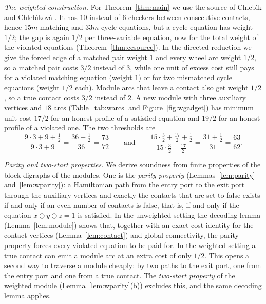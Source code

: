 \documentclass[11pt]{amsart}
\theoremstyle{definition}
\theoremstyle{remark}
\numberwithin{equation}{section}
\begin{document}
\emph{The weighted construction.} For Theorem~\ref{thm:main} we use the source of Chleb\'{\i}k and Chleb\'{\i}kov\'a \cite[Theorems~3 and~5]{CC22}. It has $10$ instead of $6$ checkers between consecutive contacts, hence $15m$ matching and $33m$ cycle equations, but a cycle equation has weight $1/2$; the gap is again $1/2$ per three-variable equation, now for the total weight of the violated equations (Theorem~\ref{thm:ccsource}). In the directed reduction we give the forced edge of a matched pair weight $1$ and every wheel arc weight $1/2$, so a matched pair costs $3/2$ instead of $3$, while one unit of excess cost still pays for a violated matching equation (weight $1$) or for two mismatched cycle equations (weight $1/2$ each). Module arcs that leave a contact also get weight $1/2$, so a true contact costs $3/2$ instead of $2$. A new module with three auxiliary vertices and $18$ arcs (Table~\ref{tab:warcs} and Figure~\ref{fig:wgadget}) has minimum unit cost $17/2$ for an honest profile of a satisfied equation and $19/2$ for an honest profile of a violated one. The two thresholds are
\[
\frac{9\cdot3+9+\tfrac12}{9\cdot3+9}=\frac{36+\tfrac12}{36}=\frac{73}{72}
\qquad\text{and}\qquad
\frac{15\cdot\tfrac32+\tfrac{17}{2}+\tfrac12}{15\cdot\tfrac32+\tfrac{17}{2}}=\frac{31+\tfrac12}{31}=\frac{63}{62}.
\]

\emph{Parity and two-start properties.} We derive soundness from finite properties of the block digraphs of the modules. One is the \emph{parity property} (Lemmas~\ref{lem:parity} and~\ref{lem:wparity}): a Hamiltonian path from the entry port to the exit port through the auxiliary vertices and exactly the contacts that are set to false exists if and only if an even number of contacts is false, that is, if and only if the equation $x\oplus y\oplus z=1$ is satisfied. In the unweighted setting the decoding lemma (Lemma~\ref{lem:module}) shows that, together with an exact cost identity for the contact vertices (Lemma~\ref{lem:contact}) and global connectivity, the parity property forces every violated equation to be paid for. In the weighted setting a true contact can emit a module arc at an extra cost of only $1/2$. This opens a second way to traverse a module cheaply: by two paths to the exit port, one from the entry port and one from a true contact. The \emph{two-start property} of the weighted module (Lemma~\ref{lem:wparity}(b)) excludes this, and the same decoding lemma applies.
\end{document}
